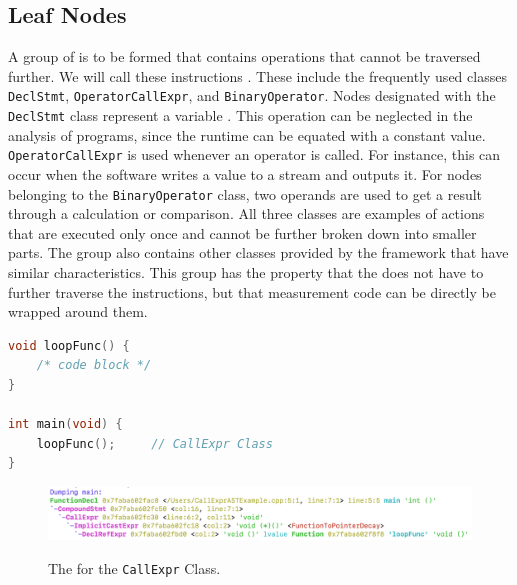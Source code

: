 \subsection{Leaf Nodes}
A group of \STATS is to be formed that contains operations that cannot be traversed further. We will call these instructions \LEASTAS. These include the frequently used classes \lstinline{DeclStmt}, \lstinline{OperatorCallExpr}, and \lstinline{BinaryOperator}. Nodes designated with the \lstinline{DeclStmt} class represent a variable \DECL. This operation can be neglected in the analysis of programs, since the runtime can be equated with a constant value. \lstinline{OperatorCallExpr} is used whenever an operator is called. For instance, this can occur when the software writes a value to a stream and outputs it. For nodes belonging to the \lstinline{BinaryOperator} class, two operands are used to get a result through a calculation or comparison. All three classes are examples of actions that are executed only once and cannot be further broken down into smaller parts. The group also contains other classes provided by the \CLANG framework that have similar characteristics. This group has the property that the \TOOL does not have to further traverse the instructions, but that measurement code can be directly be wrapped around them. 

\begin{lstlisting}[float, language=C++, caption=Example Code Showing the Definition of a Function Call., label=lst:c:ast_call_code]
void loopFunc() { 
    /* code block */ 
}

int main(void) {
    loopFunc();     // CallExpr Class
}
\end{lstlisting}

\begin{figure}[t]
    \centering
    \caption{The \AST for the \lstinline{CallExpr} Class.}
    \includegraphics[width=\textwidth]{graphics/c_ast_call.png}
    \label{fig:c:ast_call}
\end{figure}

